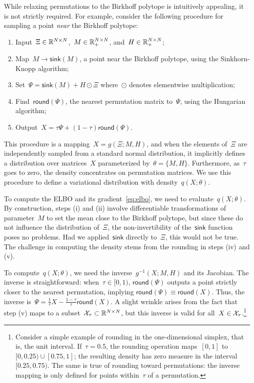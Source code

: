 \documentclass[twoside]{article}
\begin{document}
While relaxing permutations to the Birkhoff polytope is intuitively
appealing, it is not strictly required.  For example, consider the
following procedure for sampling a point \emph{near} the Birkhoff
polytope:
\begin{enumerate}[label=(\roman*)]
\item Input~${\Xi \in \mathbb{R}^{N \times N}}$,~${M \in \mathbb{R}_+^{N \times N}}$, and~${H \in \mathbb{R}_+^{N \times N}}$;
\item Map~$M \to \mathsf{sink}(M)$, a point near the Birkhoff polytope, using the Sinkhorn-Knopp algorithm;
\item Set~${\Psi = \mathsf{sink}(M) + H \odot \Xi}$ where~$\odot$ denotes elementwise multiplication;
\item Find~$\mathsf{round}(\Psi)$, the nearest permutation matrix to~$\Psi$, using the Hungarian algorithm;
\item Output~${X = \tau \Psi + (1-\tau) \mathsf{round}(\Psi)}$.
\end{enumerate}
This procedure is a mapping~$X = g(\Xi; M, H)$, and when the elements
of~$\Xi$ are independently sampled from a standard normal distribution,
it implicitly defines a distribution over matrices~$X$ parameterized
by~${\theta = \{M, H\}}$. Furthermore, as~$\tau$ goes to zero, the density
concentrates on permutation matrices.  We use this procedure to define
a variational distribution with density~$q(X; \theta)$.

To compute the ELBO and its gradient~\eqref{eq:elbo}, we need to
evaluate~$q(X; \theta)$.  By construction, steps (i) and (ii) involve
differentiable transformations of parameter~$M$ to set the mean close
to the Birkhoff polytope, but since these do not influence the
distribution of~$\Xi$, the non-invertibility of
the~$\mathsf{sink}$ function poses no problems.  Had
we applied~$\mathsf{sink}$ directly to~$\Xi$, this would not be true.
The challenge in computing the density stems from the rounding in
steps (iv) and (v).

To compute~$q(X; \theta)$, we need the inverse~$g^{-1}(X; M, H)$ and its
Jacobian.  The inverse is straightforward: when~${\tau \in [0,1)}$,
$\mathsf{round}(\Psi)$ outputs a point strictly closer to the nearest
permutation, implying
${\mathsf{round}(\Psi) \equiv \mathsf{round}(X)}$.  Thus, the inverse
is~${\Psi = \tfrac{1}{\tau}X - \tfrac{1-\tau}{\tau}
  \mathsf{round}(X)}$.  A slight wrinkle arises from the fact that
step (v) maps to a subset~$\mathcal{X}_\tau \subset \mathbb{R}^{N \times N}$, but
this inverse is valid for all~$X \in \mathcal{X}_\tau$.\footnote{Consider a
  simple example of rounding in the one-dimensional simplex, that is,
  the unit interval.  If~$\tau = 0.5$, the rounding operation
  maps~$[0,1]$ to~${[0,0.25) \cup [0.75, 1]}$; the resulting density
  has zero measure in the interval~$[0.25, 0.75)$.  The same is true
  of rounding toward permutations: the inverse mapping is only defined
  for points within~$\tau$ of a permutation. }
\end{document}
